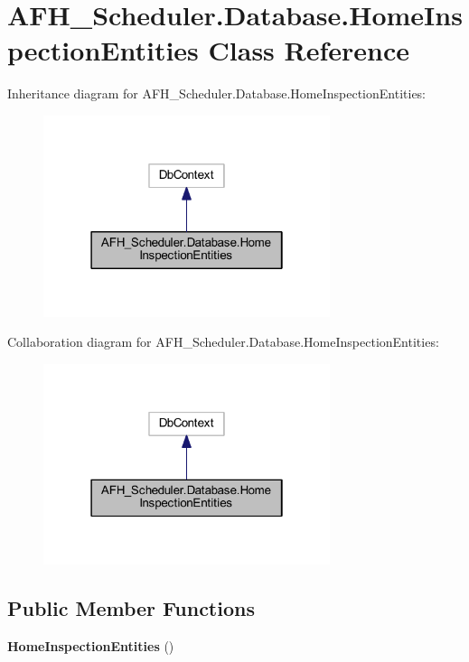 \section{A\+F\+H\+\_\+\+Scheduler.\+Database.\+Home\+Inspection\+Entities Class Reference}
\label{class_a_f_h___scheduler_1_1_database_1_1_home_inspection_entities}


Inheritance diagram for A\+F\+H\+\_\+\+Scheduler.\+Database.\+Home\+Inspection\+Entities\+:
\nopagebreak
\begin{figure}[H]
\begin{center}
\leavevmode
\includegraphics[width=238pt]{class_a_f_h___scheduler_1_1_database_1_1_home_inspection_entities__inherit__graph}
\end{center}
\end{figure}


Collaboration diagram for A\+F\+H\+\_\+\+Scheduler.\+Database.\+Home\+Inspection\+Entities\+:
\nopagebreak
\begin{figure}[H]
\begin{center}
\leavevmode
\includegraphics[width=238pt]{class_a_f_h___scheduler_1_1_database_1_1_home_inspection_entities__coll__graph}
\end{center}
\end{figure}
\subsection*{Public Member Functions}
\begin{DoxyCompactItemize}
\item 
\textbf{ Home\+Inspection\+Entities} ()
\end{DoxyCompactItemize}

